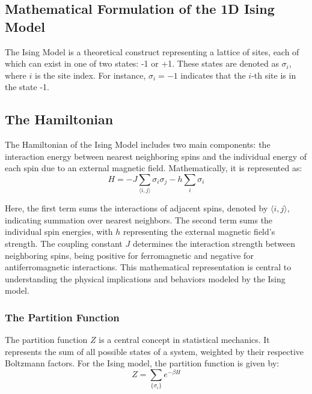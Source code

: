\subsection[Mathematical Formulation of the 1D Ising
Model]{\texorpdfstring{Mathematical Formulation of the 1D
Ising\\Model}{Mathematical Formulation of the 1D Ising Model}}
\label{sec:ising1d}

The Ising Model is a theoretical construct representing a lattice of sites, each
of which can exist in one of two states: -1 or +1. These states are denoted as
$\sigma_i$, where $i$ is the site index. For instance, $\sigma_i = -1$ indicates
that the $i$-th site is in the state -1.

\subsection{The Hamiltonian}
The Hamiltonian of the Ising Model includes two main components: the interaction
energy between nearest neighboring spins and the individual energy of each spin
due to an external magnetic field. Mathematically, it is represented as:
\begin{equation}
  \label{eq:hamiltonian}
  H = -J \sum_{\langle i,j \rangle} \sigma_i \sigma_j - h \sum_{i} \sigma_i
\end{equation}

Here, the first term sums the interactions of adjacent spins, denoted by
$\langle i,j \rangle$, indicating summation over nearest neighbors. The second
term sums the individual spin energies, with $h$ representing the external
magnetic field's strength. The coupling constant $J$ determines the interaction
strength between neighboring spins, being positive for ferromagnetic and
negative for antiferromagnetic interactions. This mathematical representation is
central to understanding the physical implications and behaviors modeled by the
Ising model.

\subsubsection{The Partition Function}
The partition function $Z$ is a central concept in statistical mechanics. It
represents the sum of all possible states of a system, weighted by their
respective Boltzmann factors. For the Ising model, the partition function is
given by:
\begin{equation}
  \label{eq:partition}
  Z = \sum_{\{\sigma_i\}} e^{-\beta H}
\end{equation}

